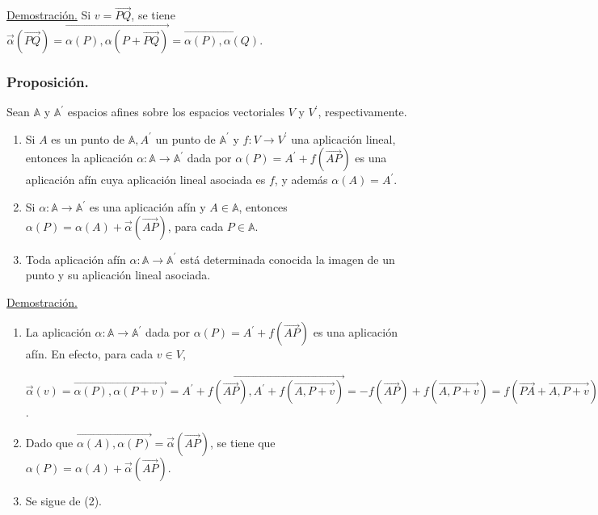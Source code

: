 \documentclass[12pt, a4paper, ones, notitlepage, openany,titlepage]{article}
\begin{document}
\underline{Demostración.} Si $v=\overrightarrow{P Q}$, se tiene $\vec{\alpha}(\overrightarrow{P Q})=\overrightarrow{\alpha(P), \alpha(P+\overrightarrow{P Q})}=\overrightarrow{\alpha(P), \alpha(Q)}$.\\

\subsubsection{Proposición.} Sean $\mathbb{A}$ y $\mathbb{A}^{\prime}$ espacios afines sobre los espacios vectoriales $V$ y $V^{\prime}$, respectivamente.

\begin{enumerate}
\item Si $A$ es un punto de $\mathbb{A}, A^{\prime}$ un punto de $\mathbb{A}^{\prime}$ y $f: V \rightarrow V^{\prime}$ una aplicación lineal, entonces la aplicación $\alpha: \mathbb{A} \rightarrow \mathbb{A}^{\prime}$ dada por $\alpha(P)=A^{\prime}+f(\overrightarrow{A P})$ es una aplicación afín cuya aplicación lineal asociada es $f$, y además $\alpha(A) = A^{'}$.

\item Si $\alpha: \mathbb{A} \rightarrow \mathbb{A}^{\prime}$ es una aplicación afín y $A \in \mathbb{A}$, entonces $\alpha(P)=\alpha(A)+\vec{\alpha}(\overrightarrow{A P})$, para cada $P \in \mathbb{A}$.

\item Toda aplicación afín $\alpha: \mathbb{A} \rightarrow \mathbb{A}^{\prime}$ está determinada conocida la imagen de un punto y su aplicación lineal asociada.
\end{enumerate}

\underline{Demostración.}
\begin{enumerate}
\item La aplicación $\alpha: \mathbb{A} \rightarrow \mathbb{A}^{\prime}$ dada por $\alpha(P)=A^{\prime}+f(\overrightarrow{A P})$ es una aplicación afín. En efecto, para cada $v \in V$,

$\vec{\alpha}(v)=\overrightarrow{\alpha(P), \alpha(P+v)}=\overrightarrow{A^{\prime}+f(\overrightarrow{A P}), A^{\prime}+f(\overrightarrow{A, P+v})}=-f(\overrightarrow{A P})+f(\overrightarrow{A, P+v})=f(\overrightarrow{PA}+\overrightarrow{A,P+v})=f(\overrightarrow{P, P+v})=f(v)$.

\item Dado que $\overrightarrow{\alpha(A), \alpha(P)}=\vec{\alpha}(\overrightarrow{A P})$, se tiene que $\alpha(P)=\alpha(A)+\vec{\alpha}(\overrightarrow{A P})$.

\item Se sigue de (2).
\end{enumerate}
\end{document}
